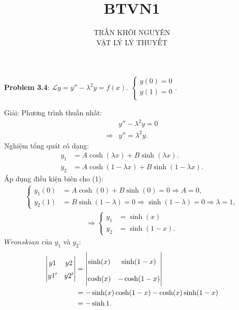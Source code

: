 \documentclass{article}
\title{\Huge{BTVN1}}
\begin{document}
\setlength{\parindent}{20pt}
\newpage
\author{TRẦN KHÔI NGUYÊN \\ VẬT LÝ LÝ THUYẾT}
\maketitle

\textbf{Problem 3.4}: $\mathcal{L}y = y'' - \lambda^2 y = f(x)$. 
$
\begin{cases}
	y(0) = 0 \\
	y(1) = 0 \\
\end{cases}.
$

Giải:
Phương trình thuần nhất:
\begin{align*}
	&y'' - \lambda^2 y = 0 \\
	\Rightarrow &y'' = \lambda^2 y.
\end{align*}
Nghiệm tổng quát có dạng:
\begin{align}
	y_1 &= A \cosh (\lambda x) + B \sinh (\lambda x).\\
	y_2 &= A \cosh (1-\lambda x) + B \sinh (1-\lambda x).
\end{align}
Áp dụng	điều kiện biên cho (1):
\begin{align*}
	\begin{cases}
		y_1(0) &= A \cosh (0) + B \sinh (0) = 0 \Rightarrow A = 0, \\
		y_2(1) &= B \sinh (1-\lambda ) = 0 \Rightarrow \sinh (1-\lambda ) = 0 \Rightarrow \lambda = 1,
	\end{cases}
\end{align*}
\begin{align}
	\Rightarrow
	\begin{cases}
		y_1 &= \sinh (x)\\
		y_2 &= \sinh (1-x).
	\end{cases}
\end{align}	
$Wronskian$ của $y_1$ và $y_2$: 
\begin{align*}
	\renewcommand{\arraystretch}{1.5}
	\begin{vmatrix}
		y1 & y2 \\
		y1' & y2'
	\end{vmatrix}
	&=
	\begin{vmatrix}\renewcommand{\arraystretch}{2}
		\sinh (x) & \sinh (1-x) \\
		\cosh (x) & -\cosh (1-x) 
	\end{vmatrix}\\
	&= 	-\sinh (x)\cosh (1-x) - \cosh (x) \sinh (1-x)\\
	&= 	-\sinh 1.
\end{align*}
\end{document}
